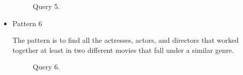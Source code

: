 \begin{itemize}
\begin{figure}[t]
\centering
{}
\caption{Query 5.}
\label{fig:query5}
\centering
\end{figure}

\item Pattern 6

The pattern is to find all the actresses, actors, and directors that worked together at least in two different movies that fall under a similar genre.


\begin{figure}[t]
\centering
{}
\caption{Query 6.}
\label{fig:query6}
\centering
\end{figure}

\end{itemize}
